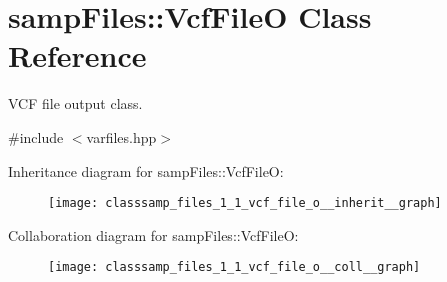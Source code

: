 \hypertarget{classsamp_files_1_1_vcf_file_o}{}\section{samp\+Files\+:\+:Vcf\+FileO Class Reference}
\label{classsamp_files_1_1_vcf_file_o}


V\+CF file output class.  




{\ttfamily \#include $<$varfiles.\+hpp$>$}



Inheritance diagram for samp\+Files\+:\+:Vcf\+FileO\+:\nopagebreak
\begin{figure}[H]
\begin{center}
\leavevmode
\texttt{[image: classsamp\_files\_1\_1\_vcf\_file\_o\_\_inherit\_\_graph]}
\end{center}
\end{figure}


Collaboration diagram for samp\+Files\+:\+:Vcf\+FileO\+:\nopagebreak
\begin{figure}[H]
\begin{center}
\leavevmode
\texttt{[image: classsamp\_files\_1\_1\_vcf\_file\_o\_\_coll\_\_graph]}
\end{center}
\end{figure}
